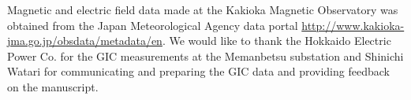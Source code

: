 \documentclass[draft,linenumbers]{agujournal2018}
\begin{document}




\acknowledgments
Magnetic and electric field data made at the Kakioka Magnetic Observatory was obtained from the Japan Meteorological Agency data portal \url{http://www.kakioka-jma.go.jp/obsdata/metadata/en}. We would like to thank the Hokkaido Electric Power Co. for the GIC measurements at the Memanbetsu substation and Shinichi Watari for communicating and preparing the GIC data and providing feedback on the manuscript. 
\end{document}
